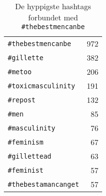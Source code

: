 \begin{table}[!h]
\centering
\captionsetup{justification=centering,singlelinecheck=off}
\caption{
  De hyppigste hashtags forbundet med \texttt{\#thebestmencanbe}
}
\begin{tabular}{lr}
\texttt{\#thebestmencanbe}   & 972 \\
\texttt{\#gillette}          & 382 \\
\texttt{\#metoo}             & 206 \\
\texttt{\#toxicmasculinity}  & 191 \\
\texttt{\#repost}            & 132 \\
\texttt{\#men}               & 85 \\
\texttt{\#masculinity}       & 76 \\
\texttt{\#feminism}          & 67 \\
\texttt{\#gillettead}        & 63 \\
\texttt{\#feminist}          & 57 \\
\texttt{\#thebestamancanget} & 57

\end{tabular}
\end{table}
